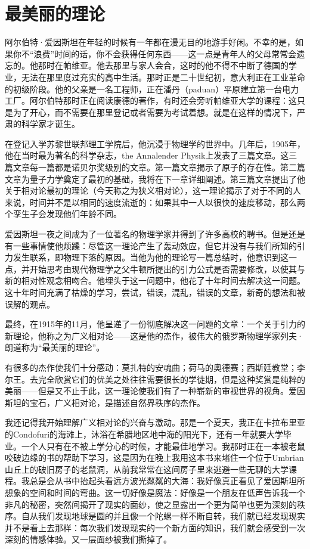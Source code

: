 	\chapter{最美丽的理论}
\indent

	阿尔伯特·爱因斯坦在年轻的时候有一年都在漫无目的地游手好闲。不幸的是，如果你不“浪费”时间的话，你不会获得任何东西——这一点是青年人的父母常常会遗忘的。他那时在帕维亚。他去那里与家人会合，这时的他不得不中断了德国的学业，无法在那里度过充实的高中生活。那时正是二十世纪初，意大利正在工业革命的初级阶段。他的父亲是一名工程师，正在潘丹（paduan）平原建立第一台电力工厂。阿尔伯特那时正在阅读康德的著作，有时还会旁听帕维亚大学的课程：这只是为了开心，而不需要在那里登记或者需要为考试着想。就是在这样的情况下，严肃的科学家才诞生。

   在登记入学苏黎世联邦理工学院后，他沉浸于物理学的世界中。几年后，1905年，他在当时最为著名的科学杂志，the Annalender Physik上发表了三篇文章。这三篇文章每一篇都是诺贝尔奖级别的文章。第一篇文章揭示了原子的存在性。第二篇文章为量子力学奠定了最初的基础，我将在下一章详细阐述。第三篇文章提出了他关于相对论最初的理论（今天称之为狭义相对论），这一理论揭示了对于不同的人来说，时间并不是以相同的速度流逝的：如果其中一人以很快的速度移动，那么两个孪生子会发现他们年龄不同。

   爱因斯坦一夜之间成为了一位著名的物理学家并得到了许多高校的聘书。但是还是有一些事情使他烦躁：尽管这一理论产生了轰动效应，但它并没有与我们所知的引力发生联系，即物理下落的原因。当他为他的理论写一篇总结时，他意识到这一点，并开始思考由现代物理学之父牛顿所提出的引力公式是否需要修改，以使其与新的相对性观念相吻合。他埋头于这一问题中，他花了十年时间去解决这一问题。这十年时间充满了枯燥的学习，尝试，错误，混乱，错误的文章，新奇的想法和被误解的观点。

   最终，在1915年的11月，他呈递了一份彻底解决这一问题的文章：一个关于引力的新理论，他称之为广义相对论——这是他的杰作，被伟大的俄罗斯物理学家列夫·朗道称为“最美丽的理论”。

   有很多的杰作使我们十分感动：莫扎特的安魂曲；荷马的奥德赛；西斯廷教堂；李尔王。去完全欣赏它们的优美之处往往需要很长的学徒期，但是这种奖赏是纯粹的美丽——但是又不止于此，这一理论使我们有了一种崭新的审视世界的视角。爱因斯坦的宝石，广义相对论，是描述自然界秩序的杰作。

   我还记得我开始理解广义相对论的兴奋与激动。那是一个夏天，我正在卡拉布里亚的Condofuri的海滩上，沐浴在希腊地区地中海的阳光下，还有一年就要大学毕业。一个人只有在不被上学分心的时候，才能最佳地学习。我那时正在一本被老鼠咬破边缘的书的帮助下学习，这是因为在晚上我用这本书来堵住一个位于Umbrian山丘上的破旧房子的老鼠洞，从前我常常在这间房子里来逃避一些无聊的大学课程。我总是会从书中抬起头看远方波光粼粼的大海：我好像真正看见了爱因斯坦所想象的空间和时间的弯曲。这一切好像是魔法：好像是一个朋友在低声告诉我一个非凡的秘密，突然间揭开了现实的面纱，使之显露出一个更为简单也更为深刻的秩序。自从我们发现地球是圆的并且像一个陀螺一样不断自转，我们就已经发现现实并不是看上去那样：每次我们发现现实的一个新方面的知识，我们就会感受到一次深刻的情感体验。又一层面纱被我们撕掉了。

